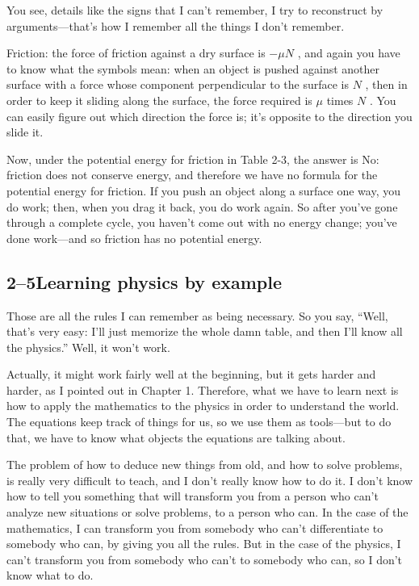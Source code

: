 \documentclass[11pt,oneside]{article}
\begin{document}
You see, details like the signs that I can't remember, I try to reconstruct by arguments---that's how I remember all the things I don't remember.\par

Friction: the force of friction against a dry surface is \(-\mu N\) , and again you have to know what the symbols mean: when an object is pushed against another surface with a force whose component perpendicular to the surface is \(N\) , then in order to keep it sliding along the surface, the force required is \(\mu\) times \(N\) . You can easily figure out which direction the force is; it's opposite to the direction you slide it.\par

Now, under the potential energy for friction in Table 2-3, the answer is No: friction does not conserve energy, and therefore we have no formula for the potential energy for friction. If you push an object along a surface one way, you do work; then, when you drag it back, you do work again. So after you've gone through a complete cycle, you haven't come out with no energy change; you've done work---and so friction has no potential energy.\par

\subsection*{2--5Learning physics by example}

Those are all the rules I can remember as being necessary. So you say, ``Well, that's very easy: I'll just memorize the whole damn table, and then I'll know all the physics.'' Well, it won't work.\par

Actually, it might work fairly well at the beginning, but it gets harder and harder, as I pointed out in Chapter 1. Therefore, what we have to learn next is how to apply the mathematics to the physics in order to understand the world. The equations keep track of things for us, so we use them as tools---but to do that, we have to know what objects the equations are talking about.\par

The problem of how to deduce new things from old, and how to solve problems, is really very difficult to teach, and I don't really know how to do it. I don't know how to tell you something that will transform you from a person who can't analyze new situations or solve problems, to a person who can. In the case of the mathematics, I can transform you from somebody who can't differentiate to somebody who can, by giving you all the rules. But in the case of the physics, I can't transform you from somebody who can't to somebody who can, so I don't know what to do.\par
\end{document}

